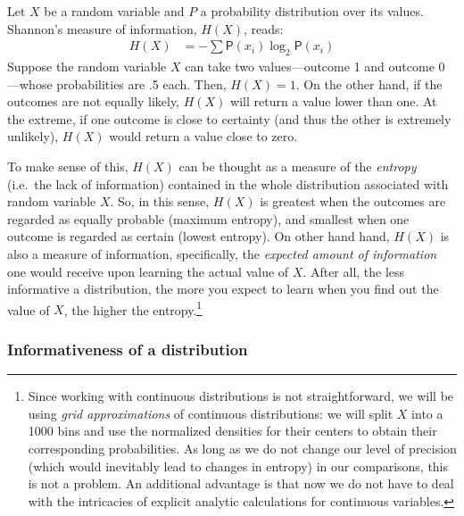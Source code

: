 \documentclass[
  10pt,
  dvipsnames,enabledeprecatedfontcommands]{scrartcl}
\begin{document}
Let \(X\) be a random variable and \(P\) a probability distribution over
its values. Shannon's measure of information, \(H(X)\), reads:
\begin{align*}
H(X)  & =
- \sum \mathsf{P}(x_i) \log_2 \mathsf{P}(x_i)
\end{align*} \noindent  Suppose the random variable \(X\) can take two
values---outcome 1 and outcome 0---whose probabilities are .5 each.
Then, \(H(X)=1\). On the other hand, if the outcomes are not equally
likely, \(H(X)\) will return a value lower than one. At the extreme, if
one outcome is close to certainty (and thus the other is extremely
unlikely), \(H(X)\) would return a value close to zero.

To make sense of this, \(H(X)\) can be thought as a measure of the
\textit{entropy} (i.e.~the lack of information) contained in the whole
distribution associated with random variable \(X\). So, in this sense,
\(H(X)\) is greatest when the outcomes are regarded as equally probable
(maximum entropy), and smallest when one outcome is regarded as certain
(lowest entropy). On other hand hand, \(H(X)\) is also a measure of
information, specifically, the \textit{expected amount of information}
one would receive upon learning the actual value of \(X\). After all,
the less informative a distribution, the more you expect to learn when
you find out the value of \(X\), the higher the entropy.\footnote{Since
  working with continuous distributions is not straightforward, we will
  be using \emph{grid approximations} of continuous distributions: we
  will split \(X\) into a 1000 bins and use the normalized densities for
  their centers to obtain their corresponding probabilities. As long as
  we do not change our level of precision (which would inevitably lead
  to changes in entropy) in our comparisons, this is not a problem. An
  additional advantage is that now we do not have to deal with the
  intricacies of explicit analytic calculations for continuous
  variables.}

\hypertarget{informativeness-of-a-distribution}{%
\subsubsection{Informativeness of a
distribution}\label{informativeness-of-a-distribution}}
\end{document}
